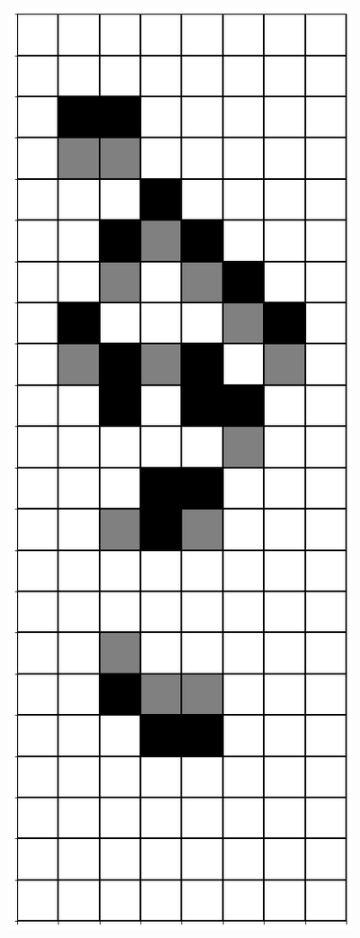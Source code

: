 \documentclass[12pt]{article}
\numberwithin{figure}{section} %
\begin{document}
\begin{figure}[H]
\begin{subfigure}{0.19\textwidth}
     \subcaption{}
   \end{subfigure}
        \begin{subfigure}{0.19\textwidth}
     \centering
     \includegraphics[width=\linewidth]{Section4/28.7}

\end{subfigure}
\end{figure}
\end{document}
